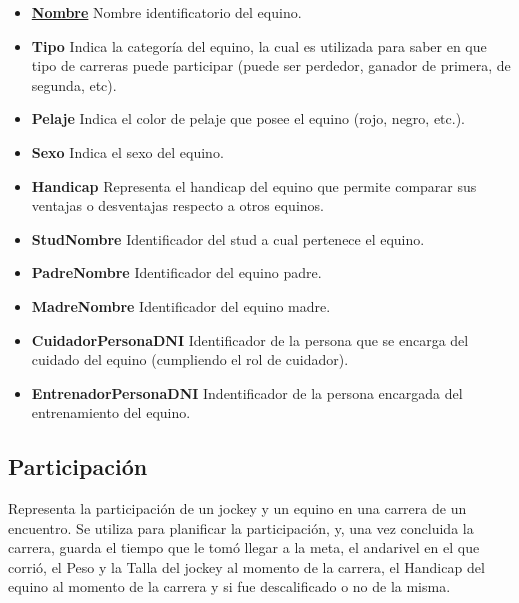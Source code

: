 \documentclass[a4paper,11pt]{article}
\begin{document}
\begin{itemize}

  \item \textbf{\uline{Nombre}} Nombre identificatorio del equino.
    
  \item \textbf{Tipo} Indica la categoría del equino, la cual es utilizada
	para saber en que tipo de carreras puede participar (puede ser perdedor, 
	ganador de primera, de segunda, etc). 
  
  \item \textbf{Pelaje} Indica el color de pelaje que posee el equino (rojo, 
	negro, etc.).
  
  \item \textbf{Sexo} Indica el sexo del equino.
  
  \item \textbf{Handicap} Representa el handicap del equino que permite comparar
	sus ventajas o desventajas respecto a otros equinos.
   
  \item \textbf{StudNombre} Identificador del stud a cual pertenece el equino.
  
  \item \textbf{PadreNombre} Identificador del equino padre.
  
  \item \textbf{MadreNombre} Identificador del equino madre.
  
  \item \textbf{CuidadorPersonaDNI} Identificador de la persona que se encarga 
	del cuidado del equino (cumpliendo el rol de cuidador).
  
  \item \textbf{EntrenadorPersonaDNI} Indentificador de la persona encargada 
	del entrenamiento del equino.
  
\end{itemize}




\subsection{Participación}

Representa la participación de un jockey y un equino en una carrera de un encuentro.
Se utiliza para planificar la participación, y, una vez concluida la carrera,  
guarda el tiempo que le tomó llegar a la meta, el andarivel en el que corrió,
el Peso y la Talla del jockey al momento de la carrera, el Handicap del equino
al momento de la carrera y si fue descalificado o no de la misma. 
\end{document}
